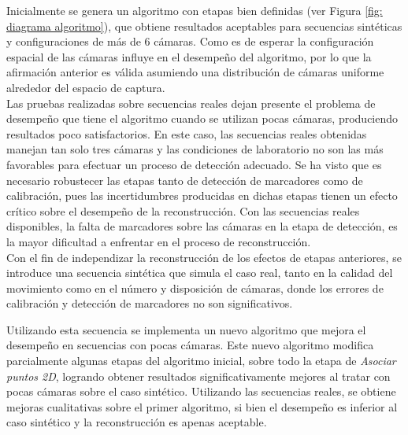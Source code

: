 Inicialmente se genera un algoritmo con etapas bien definidas (ver Figura \ref{fig: diagrama algoritmo}), que obtiene resultados aceptables para secuencias sintéticas y configuraciones de más de 6 cámaras. Como es de esperar la configuración espacial de las cámaras influye en el desempeño del algoritmo, por lo que la afirmación anterior es válida asumiendo una distribución de cámaras uniforme alrededor del espacio de captura.\\


Las pruebas realizadas sobre secuencias reales dejan presente el problema de desempeño que tiene el algoritmo cuando se utilizan pocas cámaras, produciendo resultados poco satisfactorios. 
En este caso, las secuencias reales obtenidas manejan tan solo tres cámaras y las condiciones de laboratorio no son las más favorables para efectuar un proceso de detección adecuado. Se ha visto que es necesario robustecer las etapas tanto de detección de marcadores  como de calibración, pues las incertidumbres producidas en dichas etapas tienen un efecto crítico sobre el desempeño de la reconstrucción. Con las secuencias reales disponibles, la falta de marcadores sobre las cámaras en la etapa de detección, es la mayor dificultad a enfrentar en el proceso de reconstrucción. \\



Con el fin de independizar la reconstrucción de los efectos de etapas anteriores, se introduce una secuencia sintética que simula el caso real, tanto en la calidad del movimiento como en el número y disposición de cámaras, donde los errores de calibración y detección de marcadores no son significativos.


Utilizando esta secuencia se implementa un nuevo algoritmo que mejora el desempeño en secuencias con pocas cámaras. Este nuevo algoritmo modifica parcialmente algunas etapas del algoritmo inicial, sobre todo la etapa de \emph{Asociar puntos 2D}, logrando obtener resultados significativamente mejores al tratar con pocas cámaras sobre el caso sintético.
Utilizando las secuencias reales, se obtiene mejoras cualitativas sobre el primer algoritmo, si bien el desempeño es inferior al caso sintético y la reconstrucción es apenas aceptable.  \\ 


